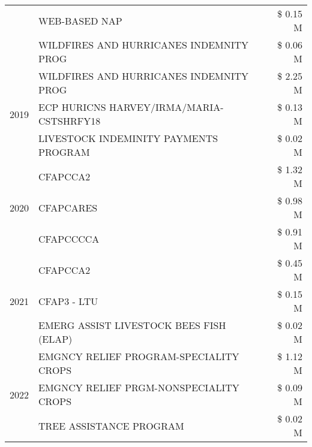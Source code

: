 \begin{tabular}{llr}
 & WEB-BASED NAP & \$ 0.15 M \\
 & WILDFIRES AND HURRICANES INDEMNITY PROG & \$ 0.06 M \\
\cline{1-3}
\multirow[t]{3}{*}{2019} & WILDFIRES AND HURRICANES INDEMNITY PROG & \$ 2.25 M \\
 & ECP HURICNS HARVEY/IRMA/MARIA-CSTSHRFY18 & \$ 0.13 M \\
 & LIVESTOCK INDEMINITY PAYMENTS PROGRAM & \$ 0.02 M \\
\cline{1-3}
\multirow[t]{3}{*}{2020} & CFAPCCA2 & \$ 1.32 M \\
 & CFAPCARES & \$ 0.98 M \\
 & CFAPCCCCA & \$ 0.91 M \\
\cline{1-3}
\multirow[t]{3}{*}{2021} & CFAPCCA2 & \$ 0.45 M \\
 & CFAP3 - LTU & \$ 0.15 M \\
 & EMERG ASSIST LIVESTOCK BEES FISH (ELAP) & \$ 0.02 M \\
\cline{1-3}
\multirow[t]{3}{*}{2022} & EMGNCY RELIEF PROGRAM-SPECIALITY CROPS & \$ 1.12 M \\
 & EMGNCY RELIEF PRGM-NONSPECIALITY CROPS & \$ 0.09 M \\
 & TREE ASSISTANCE PROGRAM & \$ 0.02 M \\
\cline{1-3}
\bottomrule
\end{tabular}
